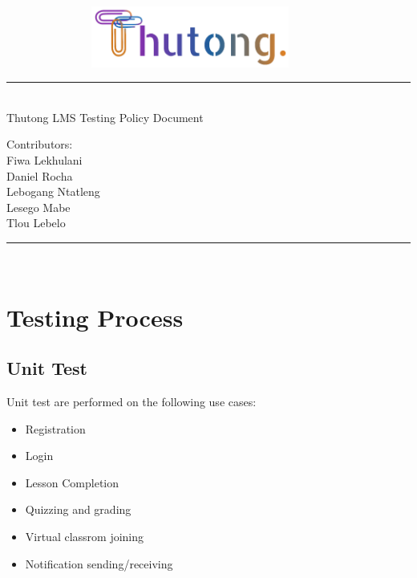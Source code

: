 \documentclass[12pt,a4paper]{article}
\begin{document}
	\begin{titlepage}
		\begin{figure}[t]
			\includegraphics[scale=0.5, height=2cm, width=10cm]{ThutongLogo.png}
		\end{figure}
		\centering
		\rule{\textwidth}{1.6pt}\\[\baselineskip]
		
		Thutong LMS
		\newline
		Testing Policy Document
		
		\vspace*{0.5cm}
		
		\large Contributors: \\[\baselineskip]
		
			{Fiwa Lekhulani\\Daniel Rocha\\Lebogang Ntatleng\\Lesego Mabe\\Tlou Lebelo}
		
		\rule{\textwidth}{1.6pt}\\[\baselineskip]
		
		
		\vspace*{\fill}
	\end{titlepage}
	
	\pagebreak
	
	\section*{Testing Process} %
		\subsection*{Unit Test}
		Unit test are performed on the following use cases:
		\begin{itemize}
			\item Registration
			\item Login
			\item Lesson Completion
			\item Quizzing and grading
			\item Virtual classrom joining
			\item Notification sending/receiving
		\end{itemize}
		
\end{document}
